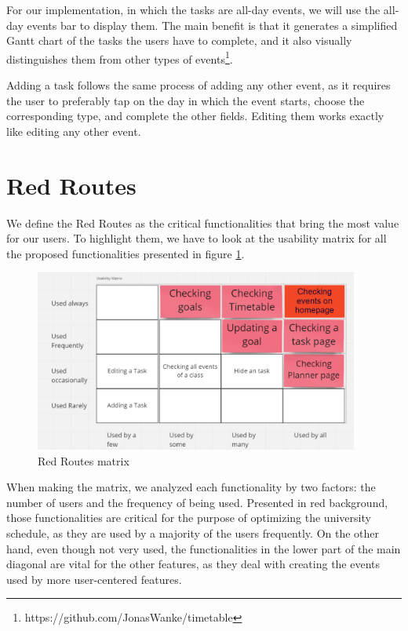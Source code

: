 For our implementation, in which the tasks are all-day events, we will use the all-day events bar to display them. The main benefit is that it generates a simplified Gantt chart of the tasks the users have to complete, and it also visually distinguishes them from other types of events\footnote{https://github.com/JonasWanke/timetable}. 
	
Adding a task follows the same process of adding any other event, as it requires the user to preferably tap on the day in which the event starts, choose the corresponding type, and complete the other fields. Editing them works exactly like editing any other event. 
\clearpage
\section{Red Routes} \label{5:routes}

 We define the Red Routes as the critical functionalities that bring the most value for our users. To highlight them, we have to look at the usability matrix for all the proposed functionalities presented in figure \ref{5:fig:matrix}.
 
 
\begin{figure}[ht]
    \centering
         \includegraphics[width=0.95\textwidth]{figures/c5/image11.png}
    \caption{Red Routes matrix} 
    \label{5:fig:matrix}
\end{figure}


When making the matrix, we analyzed each functionality by two factors: the number of users and the frequency of being used. Presented in red background, those functionalities are critical for the purpose of optimizing the university schedule, as they are used by a majority of the users frequently. On the other hand, even though not very used, the functionalities in the lower part of the main diagonal are vital for the other features, as they deal with creating the events used by more user-centered features. 

